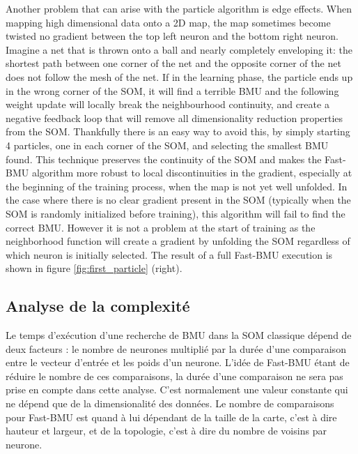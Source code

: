 	Another problem that can arise with the particle algorithm is edge effects. When mapping high dimensional data onto a 2D map, the map sometimes become twisted  no gradient between the top left neuron and the bottom right neuron. Imagine a net that is thrown onto a ball and nearly completely enveloping it: the shortest path between one corner of the net and the opposite corner of the net does not follow the mesh of the net. If in the learning phase, the particle ends up in the wrong corner of the SOM, it will find a terrible BMU and the following weight update will locally break the neighbourhood continuity, and create a negative feedback loop that will remove all dimensionality reduction properties from the SOM. Thankfully there is an easy way to avoid this, by simply starting 4 particles, one in each corner of the SOM, and selecting the smallest BMU found. This technique preserves the continuity of the SOM and makes the Fast-BMU algorithm more robust to local discontinuities in the gradient, especially at the beginning of the training process, when the map is not yet well unfolded. In the case where there is no clear gradient present in the SOM (typically when the SOM is randomly initialized before training), this algorithm will fail to find the correct BMU. However it is not a problem at the start of training as the neighborhood function will create a gradient by unfolding the SOM regardless of which neuron is initially selected. The result of a full Fast-BMU execution is shown in figure \ref{fig:first_particle} (right).

	\subsection{Analyse de la complexité}

	Le temps d'exécution d'une recherche de BMU dans la SOM classique dépend de deux facteurs : le nombre de neurones multiplié par la durée d'une comparaison entre le vecteur d'entrée et les poids d'un neurone. L'idée de Fast-BMU étant de réduire le nombre de ces comparaisons, la durée d'une comparaison ne sera pas prise en compte dans cette analyse. C'est normalement une valeur constante qui ne dépend que de la dimensionalité des données. Le nombre de comparaisons pour Fast-BMU est quand à lui dépendant de la taille de la carte, c'est à dire hauteur et largeur, et de la topologie, c'est à dire du nombre de voisins par neurone. 

